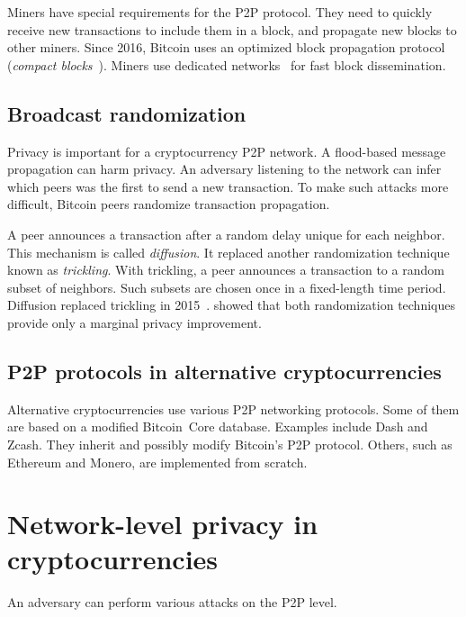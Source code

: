 Miners have special requirements for the P2P protocol.
They need to quickly receive new transactions to include them in a block, and propagate new blocks to other miners.
Since 2016, Bitcoin uses an optimized block propagation protocol (\textit{compact blocks}~\cite{Core2016}).
Miners use dedicated networks~\cite{FALCON, FIBRE} for fast block dissemination.


\subsection{Broadcast randomization}

Privacy is important for a cryptocurrency P2P network.
A flood-based message propagation can harm privacy.
An adversary listening to the network can infer which peers was the first to send a new transaction.
To make such attacks more difficult, Bitcoin peers randomize transaction propagation.

A peer announces a transaction after a random delay unique for each neighbor.
This mechanism is called \textit{diffusion}.
It replaced another randomization technique known as \textit{trickling}.
With trickling, a peer announces a transaction to a random subset of neighbors.
Such subsets are chosen once in a fixed-length time period.
Diffusion replaced trickling in 2015~\cite{Wuille}.
\cite{Fanti2017} showed that both randomization techniques provide only a marginal privacy improvement.

\subsection{P2P protocols in alternative cryptocurrencies}

Alternative cryptocurrencies use various P2P networking protocols.
Some of them are based on a modified Bitcoin~Core database.
Examples include Dash and Zcash.
They inherit and possibly modify Bitcoin's P2P protocol.
Others, such as Ethereum and Monero, are implemented from scratch.


\section{Network-level privacy in cryptocurrencies}

An adversary can perform various attacks on the P2P level.

